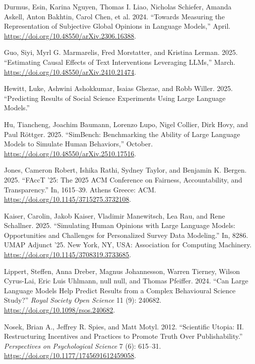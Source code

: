 \documentclass[
  letterpaper,
  DIV=11,
  numbers=noendperiod]{scrartcl}
\newlength{\cslhangindent}
\newenvironment{CSLReferences}[2] %
 {\begin{list}{}{%
  \setlength{\itemindent}{0pt}
  \setlength{\leftmargin}{0pt}
  \setlength{\parsep}{0pt}
  \ifodd #1
   \setlength{\leftmargin}{\cslhangindent}
   \setlength{\itemindent}{-1\cslhangindent}
  \fi
  \setlength{\itemsep}{#2\baselineskip}}}
 {\end{list}}
\begin{document}
\begin{CSLReferences}{1}{0}
Durmus, Esin, Karina Nguyen, Thomas I. Liao, Nicholas Schiefer, Amanda
Askell, Anton Bakhtin, Carol Chen, et al. 2024. {``Towards Measuring the
Representation of Subjective Global Opinions in Language Models,''}
April. \url{https://doi.org/10.48550/arXiv.2306.16388}.

Guo, Siyi, Myrl G. Marmarelis, Fred Morstatter, and Kristina Lerman.
2025. {``Estimating Causal Effects of Text Interventions Leveraging
LLMs,''} March. \url{https://doi.org/10.48550/arXiv.2410.21474}.

Hewitt, Luke, Ashwini Ashokkumar, Isaias Ghezae, and Robb Willer. 2025.
{``Predicting Results of Social Science Experiments Using Large Language
Models.''}

Hu, Tiancheng, Joachim Baumann, Lorenzo Lupo, Nigel Collier, Dirk Hovy,
and Paul Röttger. 2025. {``SimBench: Benchmarking the Ability of Large
Language Models to Simulate Human Behaviors,''} October.
\url{https://doi.org/10.48550/arXiv.2510.17516}.

Jones, Cameron Robert, Ishika Rathi, Sydney Taylor, and Benjamin K.
Bergen. 2025. {``FAccT '25: The 2025 ACM Conference on Fairness,
Accountability, and Transparency.''} In, 1615--39. Athens Greece: ACM.
\url{https://doi.org/10.1145/3715275.3732108}.

Kaiser, Carolin, Jakob Kaiser, Vladimir Manewitsch, Lea Rau, and Rene
Schallner. 2025. {``Simulating Human Opinions with Large Language
Models: Opportunities and Challenges for Personalized Survey Data
Modeling.''} In, 8286. UMAP Adjunct '25. New York, NY, USA: Association
for Computing Machinery. \url{https://doi.org/10.1145/3708319.3733685}.

Lippert, Steffen, Anna Dreber, Magnus Johannesson, Warren Tierney,
Wilson Cyrus-Lai, Eric Luis Uhlmann, null null, and Thomas Pfeiffer.
2024. {``Can Large Language Models Help Predict Results from a Complex
Behavioural Science Study?''} \emph{Royal Society Open Science} 11 (9):
240682. \url{https://doi.org/10.1098/rsos.240682}.

Nosek, Brian A., Jeffrey R. Spies, and Matt Motyl. 2012. {``Scientific
Utopia: II. Restructuring Incentives and Practices to Promote Truth Over
Publishability.''} \emph{Perspectives on Psychological Science} 7 (6):
615--31. \url{https://doi.org/10.1177/1745691612459058}.


\end{CSLReferences}
\end{document}

